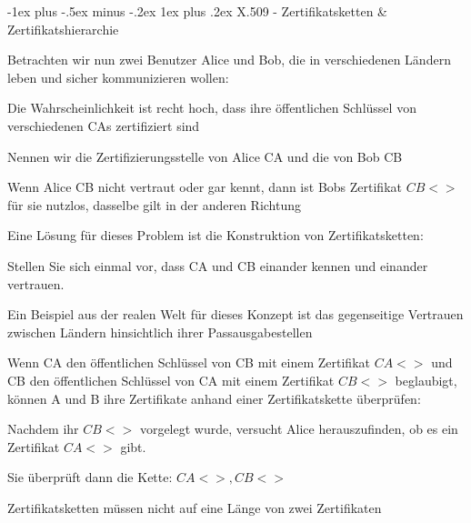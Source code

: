\documentclass[a4paper]{article}
\makeatletter
\renewcommand{\subsubsection}{\@startsection{subsubsection}{3}{0mm}%
 {-1ex plus -.5ex minus -.2ex}%
 {1ex plus .2ex}%
 {\normalfont\small\bfseries}}
\makeatother
\begin{document}
\begin{multicols}{3}
      \subsubsection{X.509 - Zertifikatsketten \& Zertifikatshierarchie}
      \begin{itemize*}
            \item Betrachten wir nun zwei Benutzer Alice und Bob, die in verschiedenen
            Ländern leben und sicher kommunizieren wollen:
            \begin{itemize*}
                  \item Die Wahrscheinlichkeit ist recht hoch, dass ihre öffentlichen Schlüssel von verschiedenen CAs zertifiziert sind
                  \item Nennen wir die Zertifizierungsstelle von Alice CA und die von Bob CB
                  \item Wenn Alice CB nicht vertraut oder gar kennt, dann ist Bobs Zertifikat $CB<>$ für sie nutzlos, dasselbe gilt in der anderen Richtung
            \end{itemize*}
            \item Eine Lösung für dieses Problem ist die Konstruktion von
            Zertifikatsketten:
            \begin{itemize*}
                  \item Stellen Sie sich einmal vor, dass CA und CB einander kennen und einander vertrauen.
                  \begin{itemize*} \item Ein Beispiel aus der realen Welt für dieses Konzept ist das gegenseitige Vertrauen zwischen Ländern hinsichtlich ihrer Passausgabestellen \end{itemize*}
                  \item Wenn CA den öffentlichen Schlüssel von CB mit einem Zertifikat $CA<>$ und CB den öffentlichen Schlüssel von CA mit einem Zertifikat $CB<>$ beglaubigt, können A und B ihre Zertifikate anhand einer Zertifikatskette überprüfen:
                  \begin{itemize*} \item Nachdem ihr $CB<>$ vorgelegt wurde, versucht Alice herauszufinden, ob es ein Zertifikat $CA<>$ gibt. \item Sie überprüft dann die Kette: $CA<>, CB<>$ \end{itemize*}
            \end{itemize*}
            \item Zertifikatsketten müssen nicht auf eine Länge von zwei Zertifikaten

\end{itemize*}
\end{multicols}
\end{document}
